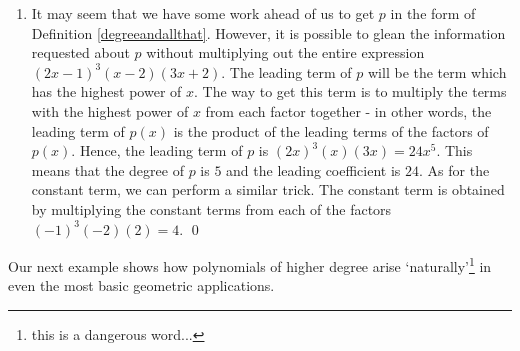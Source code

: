 \begin{ex}
\begin{enumerate}
\item  It may seem that we have some work ahead of us to get $p$ in the form of Definition \ref{degreeandallthat}.  However, it is possible to glean the information requested about $p$ without multiplying out the entire expression $(2x-1)^{3}(x-2)(3x+2)$.  The leading term of $p$ will be the term which has the highest power of $x$.  The way to get this term  is to multiply the terms with the highest power of $x$ from each factor together - in other words, the leading term of $p(x)$ is the product of the leading terms of the factors of $p(x)$.  Hence, the leading term of $p$ is $(2x)^3(x)(3x) =  24x^5$.  This means that the degree of $p$ is $5$ and the leading coefficient is $24$.  As for the constant term, we can perform a similar trick.  The constant term is obtained by multiplying the constant terms from each of the factors $(-1)^3(-2)(2) = 4$.  \qed

\end{enumerate}

\end{ex}

Our next example shows how polynomials of higher degree arise `naturally'\footnote{this is a dangerous word...} in even the most basic geometric applications.

